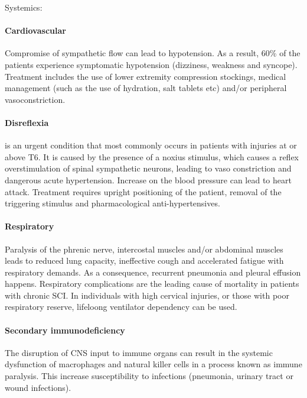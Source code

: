 \documentclass[12pt,article,oneside,a4paper]{memoir}
\begin{document}
Systemics:

\paragraph{Cardiovascular} Compromise of sympathetic flow can lead to hypotension. As a result, 60\% of the patients experience symptomatic hypotension (dizziness, weakness and syncope). Treatment includes the use of lower extremity compression stockings, medical management (such as the use of hydration, salt tablets etc) and/or peripheral vasoconstriction.

\paragraph{Disreflexia} is an urgent condition that most commonly occurs in patients with injuries at or above T6. It is caused by the presence of a noxius stimulus, which causes a reflex overstimulation of spinal sympathetic neurons, leading to vaso constriction and dangerous acute hypertension. Increase on the blood pressure can lead to heart attack. Treatment requires upright positioning of the patient, removal of the triggering stimulus and pharmacological anti-hypertensives.

\paragraph{Respiratory} Paralysis of the phrenic nerve, intercostal muscles and/or abdominal muscles leads to reduced lung capacity, ineffective cough and accelerated fatigue with respiratory demands. As a consequence, recurrent pneumonia and pleural effusion happens. Respiratory complications are the leading cause of mortality in patients with chronic SCI. In individuals with high cervical injuries, or those with poor respiratory reserve, lifeloong ventilator dependency can be used.

\paragraph{Secondary immunodeficiency} The disruption of CNS input to immune organs can result in the systemic dysfunction of macrophages and natural killer cells in a process known as immune paralysis. This increase susceptibility to infections (pneumonia, urinary tract or wound infections).
\end{document}
